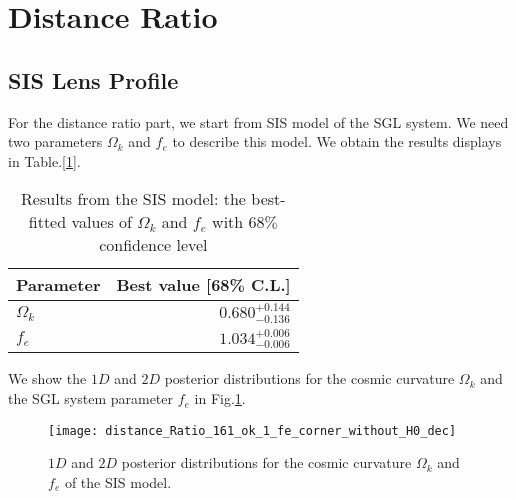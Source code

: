\documentclass[12pt]{report}
\begin{document}
\section{Distance Ratio}

\subsection{SIS Lens Profile}
For the distance ratio part, we start from SIS model of the SGL system. We need two parameters $\Omega_k$ and $f_e$ to describe this model. We obtain the results displays in Table.[\ref{tb:sl1}]. 
\begin{table}[h!]
\centering
\begin{large}
 \begin{tabular}[b]{| l | r |}\hline
       Parameter & Best value [68\% C.L.] \\ \hline \hline
    $\Omega_{k}$ & $0.680^{+0.144}_{-0.136} $ \\ \hline
   $f_e$ & $1.034^{+0.006}_{-0.006}$ \\ \hline
    \end{tabular}
\end{large}
\caption{Results from the SIS model: the best-fitted values of $\Omega_k$ and $f_e$ with $68\%$ confidence level }
\label{tb:sl1}
\end{table}
We show the $1D$ and $2D$ posterior distributions for the cosmic curvature $\Omega_k$ and the SGL system parameter $f_e$ in Fig.\ref{fig:sl2}. 
\begin{figure}[H]
    \centering
    \texttt{[image: distance\_Ratio\_161\_ok\_1\_fe\_corner\_without\_H0\_dec]}
    \caption{$1D$ and $2D$ posterior distributions for the cosmic curvature $\Omega_k$ and $f_e$ of the SIS model.}
    \label{fig:sl2}
\end{figure}
\end{document}
